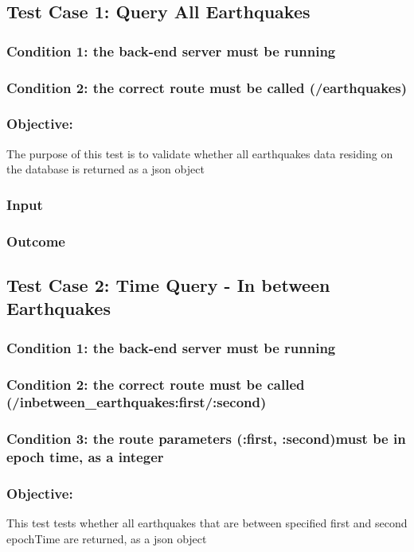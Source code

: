 \subsection{Test Case 1: Query All Earthquakes}
\subsubsection{Condition 1: the back-end server must be running}
\subsubsection{Condition 2: the correct route must be called (/earthquakes)}
\subsubsection{Objective:} The purpose of this test is to validate whether all earthquakes data residing on the database is returned  as a json object
\subsubsection{Input}
\subsubsection{Outcome}

\subsection{Test Case 2: Time Query - In between Earthquakes}

\subsubsection{Condition 1: the back-end server must be running}
\subsubsection{Condition 2: the correct route must be called (/inbetween\_earthquakes:first/:second)}
\subsubsection{Condition 3: the route parameters (:first, :second)must be in epoch time, as a integer}
\subsubsection{Objective: } This test tests whether all earthquakes that are between specified first and second epochTime are returned, as a json object
